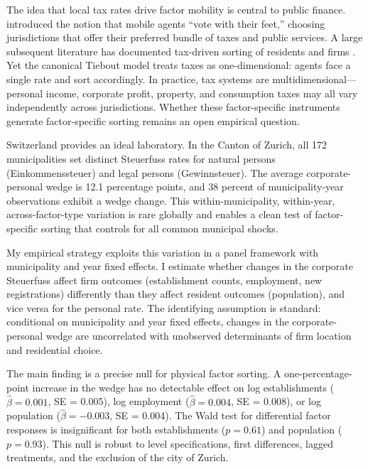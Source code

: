 \documentclass[12pt]{article}
\begin{document}
The idea that local tax rates drive factor mobility is central to public finance. \citet{tiebout1956} introduced the notion that mobile agents ``vote with their feet,'' choosing jurisdictions that offer their preferred bundle of taxes and public services. A large subsequent literature has documented tax-driven sorting of residents \citep{epple1998, schmidheiny2006, brulhart2012, kleven2014} and firms \citep{devereux2007, giroud2019, suarez_serrato2019}. Yet the canonical Tiebout model treats taxes as one-dimensional: agents face a single rate and sort accordingly. In practice, tax systems are multidimensional---personal income, corporate profit, property, and consumption taxes may all vary independently across jurisdictions. Whether these factor-specific instruments generate factor-specific sorting remains an open empirical question.

Switzerland provides an ideal laboratory. In the Canton of Zurich, all 172 municipalities set distinct Steuerfuss rates for natural persons (Einkommenssteuer) and legal persons (Gewinnsteuer). The average corporate-personal wedge is 12.1 percentage points, and 38 percent of municipality-year observations exhibit a wedge change. This within-municipality, within-year, across-factor-type variation is rare globally and enables a clean test of factor-specific sorting that controls for all common municipal shocks.

My empirical strategy exploits this variation in a panel framework with municipality and year fixed effects. I estimate whether changes in the corporate Steuerfuss affect firm outcomes (establishment counts, employment, new registrations) differently than they affect resident outcomes (population), and vice versa for the personal rate. The identifying assumption is standard: conditional on municipality and year fixed effects, changes in the corporate-personal wedge are uncorrelated with unobserved determinants of firm location and residential choice.

The main finding is a precise null for physical factor sorting. A one-percentage-point increase in the wedge has no detectable effect on log establishments ($\hat{\beta} = 0.001$, SE = 0.005), log employment ($\hat{\beta} = 0.004$, SE = 0.008), or log population ($\hat{\beta} = -0.003$, SE = 0.004). The Wald test for differential factor responses is insignificant for both establishments ($p = 0.61$) and population ($p = 0.93$). This null is robust to level specifications, first differences, lagged treatments, and the exclusion of the city of Zurich.
\end{document}
